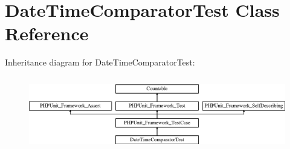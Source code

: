 \hypertarget{class_sebastian_bergmann_1_1_comparator_1_1_date_time_comparator_test}{}\section{Date\+Time\+Comparator\+Test Class Reference}
\label{class_sebastian_bergmann_1_1_comparator_1_1_date_time_comparator_test}
Inheritance diagram for Date\+Time\+Comparator\+Test\+:\begin{figure}[H]
\begin{center}
\leavevmode
\includegraphics[height=3.303835cm]{class_sebastian_bergmann_1_1_comparator_1_1_date_time_comparator_test}
\end{center}
\end{figure}
